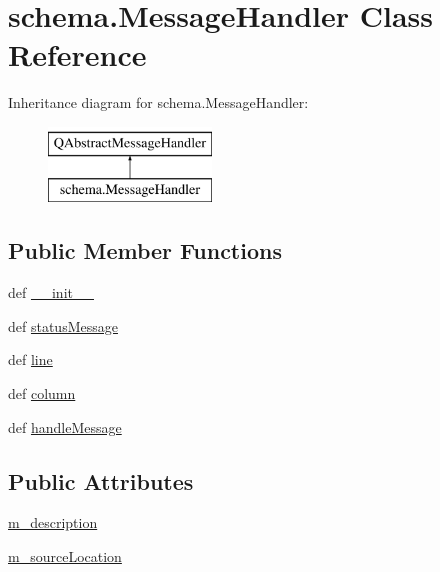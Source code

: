 \hypertarget{classschema_1_1MessageHandler}{}\section{schema.\+Message\+Handler Class Reference}
\label{classschema_1_1MessageHandler}
Inheritance diagram for schema.\+Message\+Handler\+:\begin{figure}[H]
\begin{center}
\leavevmode
\includegraphics[height=2.000000cm]{classschema_1_1MessageHandler}
\end{center}
\end{figure}
\subsection*{Public Member Functions}
\begin{DoxyCompactItemize}
\item 
def \hyperlink{classschema_1_1MessageHandler_ad132cb60d427c9bd294636660e2f840f}{\+\_\+\+\_\+init\+\_\+\+\_\+}
\item 
def \hyperlink{classschema_1_1MessageHandler_a310d6dfe935e93642f9ff72c1437b3f6}{status\+Message}
\item 
def \hyperlink{classschema_1_1MessageHandler_a8aec92a0c32ec36759ad2d1b3388766a}{line}
\item 
def \hyperlink{classschema_1_1MessageHandler_a526d84440afd892f5821bd1a36aa9217}{column}
\item 
def \hyperlink{classschema_1_1MessageHandler_ac5ee722861351b77d19fdb3c75a250a0}{handle\+Message}
\end{DoxyCompactItemize}
\subsection*{Public Attributes}
\begin{DoxyCompactItemize}
\item 
\hyperlink{classschema_1_1MessageHandler_a451825118baa647d88023434d61729c9}{m\+\_\+description}
\item 
\hyperlink{classschema_1_1MessageHandler_a65fd43d06ef585b9922da829d64c87af}{m\+\_\+source\+Location}
\end{DoxyCompactItemize}


